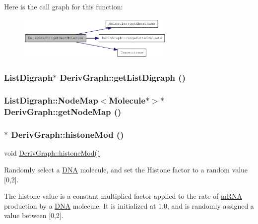 Here is the call graph for this function:\nopagebreak
\begin{figure}[H]
\begin{center}
\leavevmode
\includegraphics[width=215pt]{classDerivGraph_aaaa9598e55cbd8c55585a0488e940516_cgraph}
\end{center}
\end{figure}
\hypertarget{classDerivGraph_ae657edb3b0bf358f75f498a2d56e0456}{
\subsubsection[{getListDigraph}]{\setlength{\rightskip}{0pt plus 5cm}ListDigraph$\ast$ DerivGraph::getListDigraph ()}}
\label{classDerivGraph_ae657edb3b0bf358f75f498a2d56e0456}
\hypertarget{classDerivGraph_a41cea20de6fd631deeb82f036bc823f4}{
\subsubsection[{getNodeMap}]{\setlength{\rightskip}{0pt plus 5cm}ListDigraph::NodeMap$<${\bf Molecule}$\ast$$>$$\ast$ DerivGraph::getNodeMap ()}}
\label{classDerivGraph_a41cea20de6fd631deeb82f036bc823f4}
\hypertarget{classDerivGraph_ae39d9acba4901f668d8a85c88bfcc21a}{
\subsubsection[{histoneMod}]{ $\ast$ DerivGraph::histoneMod ()}}
\label{classDerivGraph_ae39d9acba4901f668d8a85c88bfcc21a}
void \hyperlink{classDerivGraph_ae39d9acba4901f668d8a85c88bfcc21a}{DerivGraph::histoneMod()}

Randomly select a \hyperlink{classDNA}{DNA} molecule, and set the Histone factor to a random value \mbox{[}0,2\mbox{]}.

The histone value is a constant multiplied factor applied to the rate of \hyperlink{classmRNA}{mRNA} production by a \hyperlink{classDNA}{DNA} molecule. It is initialized at 1.0, and is randomly assigned a value between \mbox{[}0,2\mbox{]}.


